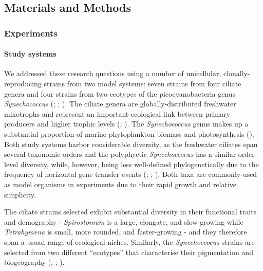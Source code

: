 \documentclass[
  letterpaper,
  DIV=11,
  numbers=noendperiod]{scrartcl}
\let\oldparagraph\paragraph
\renewcommand{\paragraph}[1]{\oldparagraph{#1}\mbox{}}
\begin{document}
\subsection{Materials and Methods}\label{sec-DAE_methods}

\subsubsection{Experiments}\label{experiments}

\paragraph{Study systems}\label{study-systems}

We addressed these research questions using a number of unicellular,
clonally-reproducing strains from two model systems: seven strains from
four ciliate genera and four strains from two ecotypes of the
picocyanobacteria genus \emph{Synechococcus}
(;
;
). The ciliate genera are
globally-distributed freshwater mixotrophs and represent an important
ecological link between primary producers and higher trophic levels
(;
). The
\emph{Synechococcus} genus makes up a substantial proportion of marine
phytoplankton biomass and photosynthesis
(). Both study systems
harbor considerable diversity, as the freshwater ciliates span several
taxonomic orders and the polyphyetic \emph{Synechoccocus} has a similar
order-level diversity, while, however, being less well-defined
phylogenetically due to the frequency of horizontal gene transfer events
(;
;
). Both taxa are
commonly-used as model organisms in experiments due to their rapid
growth and relative simplicity.

The ciliate strains selected exhibit substantial diversity in their
functional traits and demography - \emph{Spirostomum} is a large,
elongate, and slow-growing while \emph{Tetrahymena} is small, more
rounded, and faster-growing - and they therefore span a broad range of
ecological niches. Similarly, the \emph{Synechoccocus} strains are
selected from two different ``ecotypes'' that characterise their
pigmentation and biogeography (; ;
).
\end{document}

